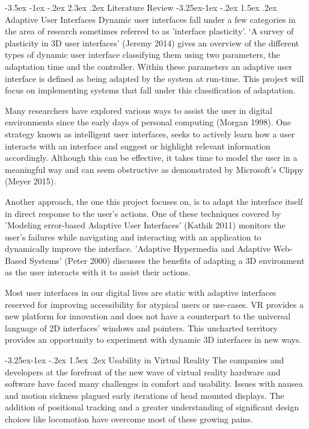 \documentclass[11pt]{article}
\makeatletter
\renewcommand{\section}{\@startsection {section}{1}{\z@}%
             {-3.5ex \@plus -1ex \@minus -.2ex}%
             {2.3ex \@plus .2ex}%
             {\normalfont\Large\scshape\bfseries}}
\renewcommand{\subsection}{\@startsection{subsection}{2}{\z@}%
             {-3.25ex\@plus -1ex \@minus -.2ex}%
             {1.5ex \@plus .2ex}%
             {\normalfont\large\scshape\bfseries}}
\makeatother
\begin{document}
\section{Literature Review}
\subsection{Adaptive User Interfaces}
Dynamic user interfaces fall under a few categories in the area of research sometimes referred to as 'interface plasticity'. ‘A survey of plasticity in 3D user interfaces' (Jeremy 2014) gives an overview of the different types of dynamic user interface classifying them using two parameters, the adaptation time and the controller. Within these parameters an adaptive user interface is defined as being adapted by the system at run-time. This project will focus on implementing systems that fall under this classification of adaptation.

Many researchers have explored various ways to assist the user in digital environments since the early days of personal computing (Morgan 1998). One strategy known as intelligent user interfaces, seeks to actively learn how a user interacts with an interface and suggest or highlight relevant information accordingly. Although this can be effective, it takes time to model the user in a meaningful way and can seem obstructive as demonstrated by Microsoft's Clippy (Meyer 2015).

Another approach, the one this project focuses on, is to adapt the interface itself in direct response to the user's actions. One of these techniques covered by 'Modeling error-based Adaptive User Interfaces' (Kathik 2011) monitors the user's failures while navigating and interacting with an application to dynamically improve the interface. 'Adaptive Hypermedia and Adaptive Web-Based Systems' (Peter 2000) discusses the benefits of adapting a 3D environment as the user interacts with it to assist their actions.

Most user interfaces in our digital lives are static with adaptive interfaces reserved for improving accessibility for atypical users or use-cases. VR provides a new platform for innovation and does not have a counterpart to the universal language of 2D interfaces' windows and pointers. This uncharted territory provides an opportunity to experiment with dynamic 3D interfaces in new ways.

\subsection{Usability in Virtual Reality}
The companies and developers at the forefront of the new wave of virtual reality hardware and software have faced many challenges in comfort and usability. Issues with nausea and motion sickness plagued early iterations of head mounted displays. The addition of positional tracking and a greater understanding of significant design choices like locomotion have overcome most of these growing pains.
\end{document}
